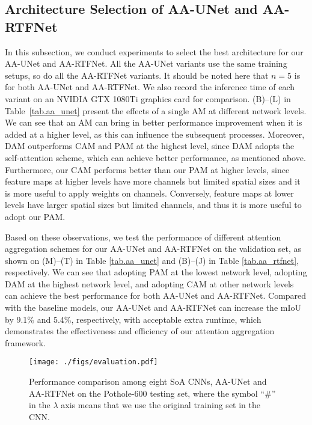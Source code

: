\documentclass[runningheads]{llncs}
\begin{document}
\subsection{Architecture Selection of AA-UNet and AA-RTFNet}
\label{sec.architecture_selection}
In this subsection, we conduct experiments to select the best architecture for our AA-UNet and AA-RTFNet. All the AA-UNet variants use the same training setups, so do all the AA-RTFNet variants. It should be noted here that $n=5$ is for both AA-UNet and AA-RTFNet. We also record the inference time of each variant on an NVIDIA GTX 1080Ti graphics card for comparison. (B)--(L) in Table~\ref{tab.aa_unet} present the effects of a single AM at different network levels. We can see that an AM can bring in better performance improvement when it is added at a higher level, as this can influence the subsequent processes. Moreover, DAM outperforms CAM and PAM at the highest level, since DAM adopts the self-attention scheme, which can achieve better performance, as mentioned above. Furthermore, our CAM performs better than our PAM at higher levels, since feature maps at higher levels have more channels but limited spatial sizes and it is more useful to apply weights on channels. Conversely, feature maps at lower levels have larger spatial sizes but limited channels, and thus it is more useful to adopt our PAM.

Based on these observations, we test the performance of different attention aggregation schemes for our AA-UNet and AA-RTFNet on the validation set, as shown on (M)--(T) in Table \ref{tab.aa_unet} and (B)--(J) in Table \ref{tab.aa_rtfnet}, respectively. We can see that adopting PAM at the lowest network level, adopting DAM at the highest network level, and adopting CAM at other network levels can achieve the best performance for both AA-UNet and AA-RTFNet. Compared with the baseline models, our AA-UNet and AA-RTFNet can increase the mIoU by 9.1\% and 5.4\%, respectively, with acceptable extra runtime, which demonstrates the effectiveness and efficiency of our attention aggregation framework.

\begin{figure}[!htbp]
    \centering
    \texttt{[image: ./figs/evaluation.pdf]}
    \caption{Performance comparison among eight SoA CNNs, AA-UNet and AA-RTFNet on the Pothole-600 testing set, where the symbol ``\#'' in the $\lambda$ axis  means that we use the original training set in the CNN. }
    \label{fig.evaluation}
\end{figure}
\end{document}
